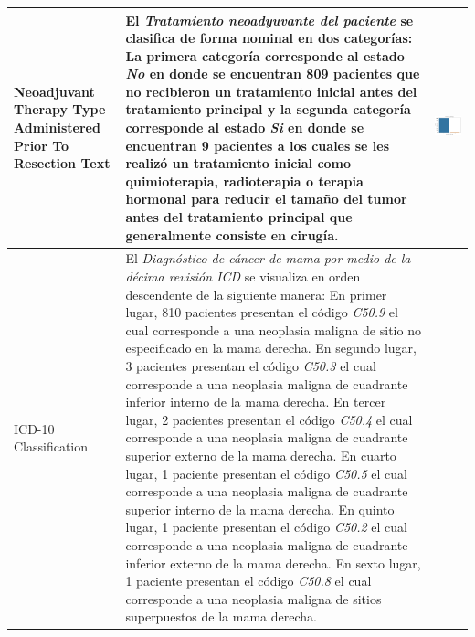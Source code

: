 \begin{table}[!htb]
	\footnotesize
	\begin{threeparttable}
		\begin{tabular}{p{2.5cm} p{7cm} p{6.5cm}} \toprule
			Neoadjuvant Therapy Type Administered Prior To Resection Text
			& El \textit{Tratamiento neoadyuvante del paciente} se clasifica de forma nominal en dos categorías: La primera categoría corresponde al estado \textit{No} en donde se encuentran 809 pacientes que no recibieron un tratamiento inicial antes del tratamiento principal y la segunda categoría corresponde al estado \textit{Si} en donde se encuentran 9 pacientes a los cuales se les realizó un tratamiento inicial como quimioterapia, radioterapia o terapia hormonal para reducir el tamaño del tumor antes del tratamiento principal que generalmente consiste en cirugía.
			& \begin{center}\includegraphics[width=1\linewidth]{NOTEBOOK/IMAGENES_DESCRIPTIVAS/23_neoadjuvant_therapy}\end{center}
			\\ \hline
			
			ICD-10 Classification
			& El \textit{Diagnóstico de cáncer de mama por medio de la décima revisión ICD} se visualiza en orden descendente de la siguiente manera: En primer lugar, 810 pacientes presentan el código \textit{C50.9} el cual corresponde a una neoplasia maligna de sitio no especificado en la mama derecha. En segundo lugar, 3 pacientes presentan el código \textit{C50.3} el cual corresponde a una neoplasia maligna de cuadrante inferior interno de la mama derecha. En tercer lugar, 2 pacientes presentan el código \textit{C50.4} el cual corresponde a una neoplasia maligna de cuadrante superior externo de la mama derecha. En cuarto lugar, 1 paciente presentan el código \textit{C50.5} el cual corresponde a una neoplasia maligna de cuadrante superior interno de la mama derecha. En quinto lugar, 1 paciente presentan el código \textit{C50.2} el cual corresponde a una neoplasia maligna de cuadrante inferior externo de la mama derecha. En sexto lugar, 1 paciente presentan el código \textit{C50.8} el cual corresponde a una neoplasia maligna de sitios superpuestos de la mama derecha.
			

\end{tabular}
\end{threeparttable}
\end{table}
